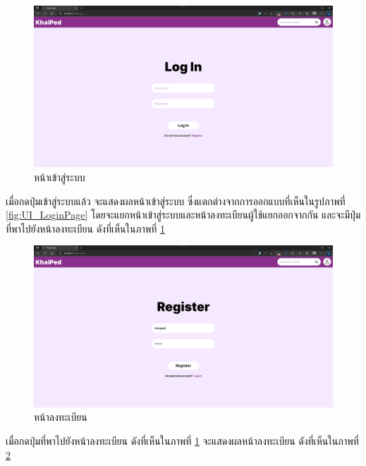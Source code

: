 \documentclass[12pt,oneside,openright,a4paper]{cpe-thai-project}
\begin{document}
\pagebreak
\begin{figure}[!h]\centering
	\includegraphics[width=\textwidth, keepaspectratio=true]{image/chap4/UI/login.png}
	\caption{{หน้าเข้าสู่ระบบ}}\label{fig:chap4UILogIn}
\end{figure}
\hspace{1cm}
เมื่อกดปุ่มเข้าสู่ระบบแล้ว จะแสดงผลหน้าเข้าสู่ระบบ ซึ่งแตกต่างจากการออกแบบที่เห็นในรูปภาพที่ \ref{fig:UI_LoginPage}  
โดยจะแยกหน้าเข้าสู่ระบบและหน้าลงทะเบียนผู้ใช้แยกออกจากกัน และจะมีปุ่มที่พาไปยังหน้าลงทะเบียน ดังที่เห็นในภาพที่ \ref{fig:chap4UILogIn}

\begin{figure}[!h]\centering
	\includegraphics[width=\textwidth, keepaspectratio=true]{image/chap4/UI/register.png}
	\caption{{หน้าลงทะเบียน}}\label{fig:chap4UIRegister}
\end{figure}
\hspace{1cm}
เมื่อกดปุ่มที่พาไปยังหน้าลงทะเบียน ดังที่เห็นในภาพที่ \ref{fig:chap4UILogIn} จะแสดงผลหน้าลงทะเบียน 
ดังที่เห็นในภาพที่ \ref{fig:chap4UIRegister}
\end{document}

